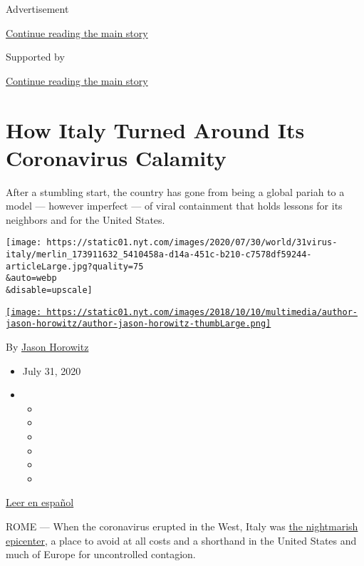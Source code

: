 Advertisement

\protect\hyperlink{after-top}{Continue reading the main story}

Supported by

\protect\hyperlink{after-sponsor}{Continue reading the main story}

\hypertarget{how-italy-turned-around-its-coronavirus-calamity}{%
\section{How Italy Turned Around Its Coronavirus
Calamity}\label{how-italy-turned-around-its-coronavirus-calamity}}

After a stumbling start, the country has gone from being a global pariah
to a model --- however imperfect --- of viral containment that holds
lessons for its neighbors and for the United States.

\texttt{[image: https://static01.nyt.com/images/2020/07/30/world/31virus-italy/merlin\_173911632\_5410458a-d14a-451c-b210-c7578df59244-articleLarge.jpg?quality=75\\\&auto=webp\\\&disable=upscale]}

\href{https://www.nytimes.com/by/jason-horowitz}{\texttt{[image: https://static01.nyt.com/images/2018/10/10/multimedia/author-jason-horowitz/author-jason-horowitz-thumbLarge.png]}}

By \href{https://www.nytimes.com/by/jason-horowitz}{Jason Horowitz}

\begin{itemize}
\item
  July 31, 2020
\item
  \begin{itemize}
  \item
  \item
  \item
  \item
  \item
  \item
  \end{itemize}
\end{itemize}

\href{https://www.nytimes.com/es/2020/08/05/espanol/mundo/italia-reapertura-coronavirus.html}{Leer
en español}

ROME --- When the coronavirus erupted in the West, Italy was
\href{https://www.nytimes.com/interactive/2020/03/27/world/europe/coronavirus-italy-bergamo.html}{the
nightmarish epicenter}, a place to avoid at all costs and a shorthand in
the United States and much of Europe for uncontrolled contagion.

